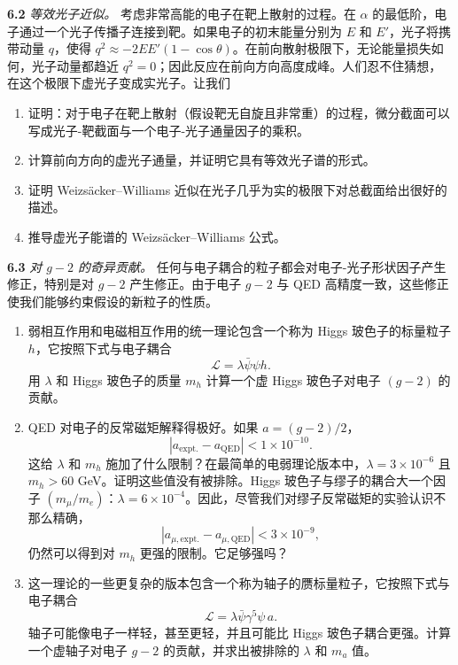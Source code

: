 \textbf{6.2} \emph{等效光子近似。} 考虑非常高能的电子在靶上散射的过程。在 $\alpha$ 的最低阶，电子通过一个光子传播子连接到靶。如果电子的初末能量分别为 $E$ 和 $E'$，光子将携带动量 $q$，使得 $q^2 \approx -2EE'(1-\cos\theta)$。在前向散射极限下，无论能量损失如何，光子动量都趋近 $q^2 = 0$；因此反应在前向方向高度成峰。人们忍不住猜想，在这个极限下虚光子变成实光子。让我们
\begin{enumerate}[label=(\alph*)]
  \item 证明：对于电子在靶上散射（假设靶无自旋且非常重）的过程，微分截面可以写成光子-靶截面与一个电子-光子通量因子的乘积。
  \item 计算前向方向的虚光子通量，并证明它具有等效光子谱的形式。
  \item 证明 Weizs\"acker--Williams 近似在光子几乎为实的极限下对总截面给出很好的描述。
  \item 推导虚光子能谱的 Weizs\"acker--Williams 公式。
\end{enumerate}

\textbf{6.3} \emph{对 $g-2$ 的奇异贡献。} 任何与电子耦合的粒子都会对电子-光子形状因子产生修正，特别是对 $g-2$ 产生修正。由于电子 $g-2$ 与 QED 高精度一致，这些修正使我们能够约束假设的新粒子的性质。
\begin{enumerate}[label=(\alph*)]
  \item 弱相互作用和电磁相互作用的统一理论包含一个称为 Higgs 玻色子的标量粒子 $h$，它按照下式与电子耦合
    \begin{equation}
      \mathcal{L} = \lambda\bar{\psi}\psi h .
    \end{equation}
    用 $\lambda$ 和 Higgs 玻色子的质量 $m_h$ 计算一个虚 Higgs 玻色子对电子 $(g-2)$ 的贡献。
  \item QED 对电子的反常磁矩解释得极好。如果 $a = (g-2)/2$，
    \begin{equation}
      |a_{\mathrm{expt.}} - a_{\mathrm{QED}}| < 1\times10^{-10} .
    \end{equation}
    这给 $\lambda$ 和 $m_h$ 施加了什么限制？在最简单的电弱理论版本中，$\lambda = 3\times10^{-6}$ 且 $m_h > 60$ GeV。证明这些值没有被排除。Higgs 玻色子与缪子的耦合大一个因子 $(m_\mu/m_e)$：$\lambda = 6\times10^{-4}$。因此，尽管我们对缪子反常磁矩的实验认识不那么精确，
    \begin{equation}
      |a_{\mu,\mathrm{expt.}} - a_{\mu,\mathrm{QED}}| < 3\times10^{-9},
    \end{equation}
    仍然可以得到对 $m_h$ 更强的限制。它足够强吗？
  \item 这一理论的一些更复杂的版本包含一个称为轴子的赝标量粒子，它按照下式与电子耦合
    \begin{equation}
      \mathcal{L} = \lambda\bar{\psi}\gamma^5\psi\,a .
    \end{equation}
    轴子可能像电子一样轻，甚至更轻，并且可能比 Higgs 玻色子耦合更强。计算一个虚轴子对电子 $g-2$ 的贡献，并求出被排除的 $\lambda$ 和 $m_a$ 值。
\end{enumerate}
